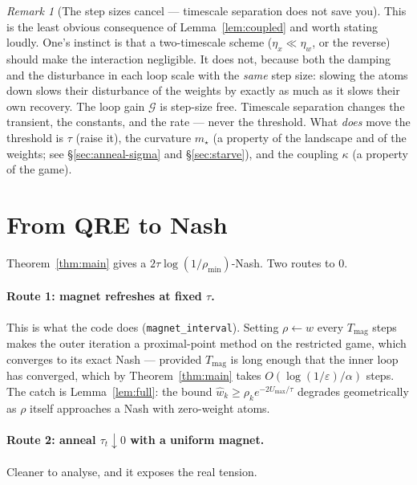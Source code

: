 \documentclass[11pt,a4paper]{article}
\theoremstyle{plain}
\theoremstyle{definition}
\theoremstyle{remark}
\newtheorem{remark}[theorem]{Remark}
\newcommand{\eps}{\varepsilon}
\begin{document}
\begin{remark}[The step sizes cancel --- timescale separation does not save you]
This is the least obvious consequence of Lemma~\ref{lem:coupled} and worth stating
loudly. One's instinct is that a two-timescale scheme ($\eta_x\ll\eta_w$, or the
reverse) should make the interaction negligible. It does not, because both the
damping and the disturbance in each loop scale with the \emph{same} step size:
slowing the atoms down slows their disturbance of the weights by exactly as much as
it slows their own recovery. The loop gain $\mathcal G$ is step-size free. Timescale
separation changes the transient, the constants, and the rate --- never the
threshold. What \emph{does} move the threshold is $\tau$ (raise it), the curvature
$m_\star$ (a property of the landscape and of the weights; see \S\ref{sec:anneal-sigma}
and \S\ref{sec:starve}), and the coupling $\kappa$ (a property of the game).
\end{remark}

\section{From QRE to Nash}\label{sec:anneal-tau}

Theorem~\ref{thm:main} gives a $2\tau\log(1/\rho_{\min})$-Nash. Two routes to $0$.

\paragraph{Route 1: magnet refreshes at fixed $\tau$.} This is what the code does
(\texttt{magnet\_interval}). Setting $\rho\leftarrow w$ every $T_{\mathrm{mag}}$
steps makes the outer iteration a proximal-point method on the restricted game, which
converges to its exact Nash --- provided $T_{\mathrm{mag}}$ is long enough that the
inner loop has converged, which by Theorem~\ref{thm:main} takes
$O(\log(1/\eps)/\alpha)$ steps. The catch is Lemma~\ref{lem:full}: the bound
$\hat w_k\ge\rho_k e^{-2U_{\max}/\tau}$ degrades geometrically as $\rho$ itself
approaches a Nash with zero-weight atoms.

\paragraph{Route 2: anneal $\tau_t\downarrow0$ with a uniform magnet.} Cleaner to
analyse, and it exposes the real tension.
\end{document}
